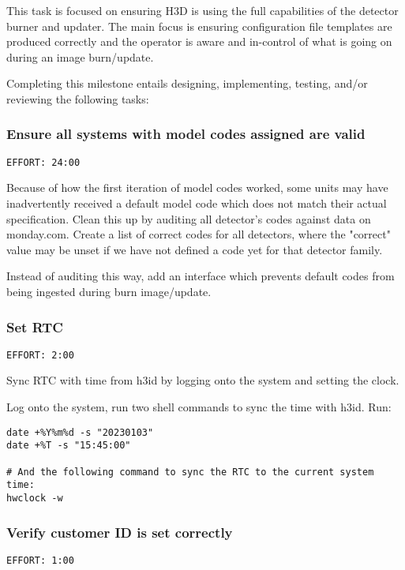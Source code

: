 \documentclass[11pt]{article}
\begin{document}
This task is focused on ensuring H3D is using the full capabilities of the detector burner and
updater. The main focus is ensuring configuration file templates are produced correctly and the
operator is aware and in-control of what is going on during an image burn/update.

Completing this milestone entails designing, implementing, testing, and/or reviewing the following
tasks:

\subsubsection{Ensure all systems with model codes assigned are valid}
\label{sec:orgb0946c0}
\begin{verbatim}
EFFORT: 24:00
\end{verbatim}

Because of how the first iteration of model codes worked, some units may have inadvertently received
a default model code which does not match their actual specification. Clean this up by auditing all
detector's codes against data on monday.com. Create a list of correct codes for all detectors, where
the "correct" value may be unset if we have not defined a code yet for that detector family.

Instead of auditing this way, add an interface which prevents default codes from being ingested
during burn image/update.

\subsubsection{Set RTC}
\label{sec:org3a3b41b}
\begin{verbatim}
EFFORT: 2:00
\end{verbatim}

Sync RTC with time from h3id by logging onto the system and setting the clock.

Log onto the system, run two shell commands to sync the time with h3id. Run:

\begin{verbatim}
date +%Y%m%d -s "20230103"
date +%T -s "15:45:00"

# And the following command to sync the RTC to the current system time:
hwclock -w
\end{verbatim}

\subsubsection{Verify customer ID is set correctly}
\label{sec:org4e5434a}
\begin{verbatim}
EFFORT: 1:00
\end{verbatim}
\end{document}
